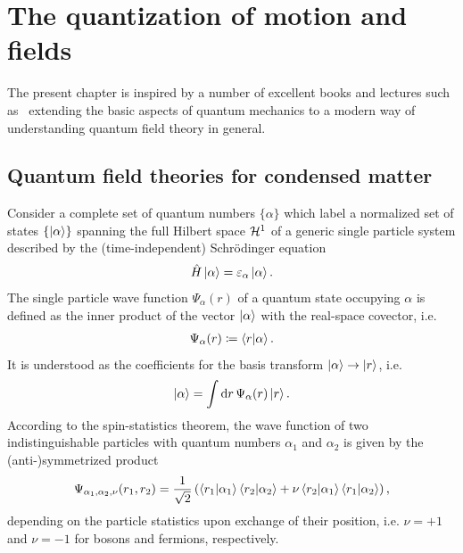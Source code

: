 \chapter{The quantization of motion and fields}
\label{ch:the_quantization_of_motion_and_fields}
The present chapter is inspired by a number of excellent books and lectures such as~\cite{AshcroftMermin1978,AltlandSimons2010,BruusFlensberg2004,Czycholl2016,FetterWalecka2003,Giamarchi2003,Rizzi2016,Burrello2020} extending the basic aspects of quantum mechanics to a modern way of understanding quantum field theory in general.
%
%
\section{Quantum field theories for condensed matter}
\label{sec:creation_and_annihilation_operators}
%
%
Consider a complete set of quantum numbers $\{\alpha\}$ which label a normalized set of states $\{\ket{\alpha}\}$ spanning the full Hilbert space $\mathcal{H}^1$ of a generic single particle system described by the (time-independent) Schrödinger equation
\begin{align}
    \hat H \ket{\alpha} = \varepsilon_\alpha\ket{\alpha}.
\end{align}
The single particle wave function $\Psi_\alpha(r)$ of a quantum state occupying $\alpha$ is defined as the inner product of the vector $\ket{\alpha}$ with the real-space covector, i.e.
\begin{align}
    \Psi_\alpha(r) \coloneqq \braket{r|\alpha}.
\end{align}
It is understood as the coefficients for the basis transform $\ket{\alpha}\rightarrow\ket{r}$, i.e.
\begin{align}
    \ket{\alpha} = \int{\rm d}{r}\, \Psi_\alpha(r) \ket{r}.
\end{align}
According to the spin-statistics theorem, the wave function of two indistinguishable particles with quantum numbers $\alpha_1$ and $\alpha_2$ is given by the (anti-)symmetrized product
\begin{align}
    \Psi_{\alpha_1,\alpha_2,\nu}(r_1,r_2) = \frac1{\sqrt2}\left(\braket{r_1|\alpha_1}\braket{r_2|\alpha_2} + \nu\braket{r_2|\alpha_1}\braket{r_1|\alpha_2}\right),
\end{align}
depending on the particle statistics upon exchange of their position, i.e. $\nu=+1$ and $\nu=-1$ for bosons and fermions, respectively.
